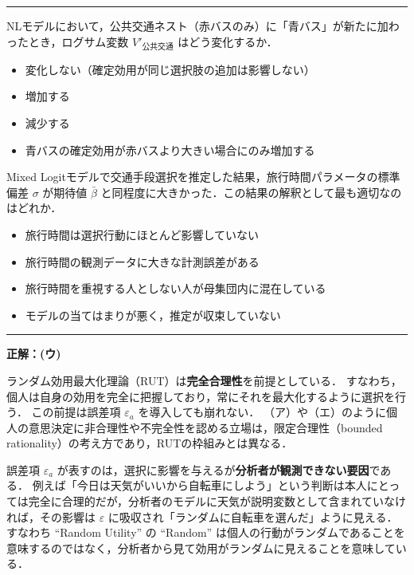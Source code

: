 \vspace{1em}
\hrule
\vspace{1em}




\begin{example}[title={クイズ 2：ログサム変数の直感的意味}]
NLモデルにおいて，公共交通ネスト（赤バスのみ）に「青バス」が新たに加わったとき，ログサム変数 $V'_{\text{公共交通}}$ はどう変化するか．
\begin{itemize}
  \item[(ア)] 変化しない（確定効用が同じ選択肢の追加は影響しない）
  \item[(イ)] 増加する
  \item[(ウ)] 減少する
  \item[(エ)] 青バスの確定効用が赤バスより大きい場合にのみ増加する
\end{itemize}
\end{example}

\begin{example}[title={クイズ 3：Mixed Logitの推定結果の解釈}]
Mixed Logitモデルで交通手段選択を推定した結果，旅行時間パラメータの標準偏差 $\sigma$ が期待値 $\bar{\beta}$ と同程度に大きかった．この結果の解釈として最も適切なのはどれか．
\begin{itemize}
  \item[(ア)] 旅行時間は選択行動にほとんど影響していない
  \item[(イ)] 旅行時間の観測データに大きな計測誤差がある
  \item[(ウ)] 旅行時間を重視する人としない人が母集団内に混在している
  \item[(エ)] モデルの当てはまりが悪く，推定が収束していない
\end{itemize}
\end{example}

\vspace{1em}
\hrule
\vspace{1em}


\begin{example}[title={クイズ 1 正解・解説}]
\label{ans:q1}
\textbf{正解：(ウ)}

ランダム効用最大化理論（RUT）は\textbf{完全合理性}を前提としている．
すなわち，個人は自身の効用を完全に把握しており，常にそれを最大化するように選択を行う．
この前提は誤差項 $\varepsilon_a$ を導入しても崩れない．
（ア）や（エ）のように個人の意思決定に非合理性や不完全性を認める立場は，限定合理性（bounded rationality）の考え方であり，RUTの枠組みとは異なる．

誤差項 $\varepsilon_a$ が表すのは，選択に影響を与えるが\textbf{分析者が観測できない要因}である．
例えば「今日は天気がいいから自転車にしよう」という判断は本人にとっては完全に合理的だが，分析者のモデルに天気が説明変数として含まれていなければ，その影響は $\varepsilon$ に吸収され「ランダムに自転車を選んだ」ように見える．
すなわち ``Random Utility'' の ``Random'' は個人の行動がランダムであることを意味するのではなく，分析者から見て効用がランダムに見えることを意味している．
\end{example}



